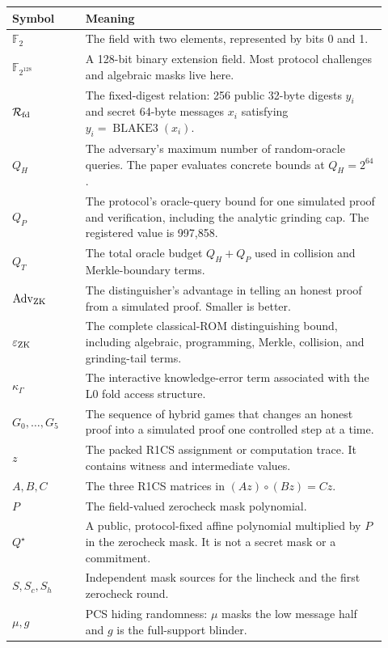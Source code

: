 \documentclass[11pt]{article}
\newcommand{\F}{\mathbb{F}}
\begin{document}
\begin{longtable}{@{}>{\raggedright\arraybackslash}p{0.18\linewidth}
                       >{\raggedright\arraybackslash}p{0.74\linewidth}@{}}
\toprule
Symbol & Meaning \\
\midrule
\endhead
$\F_2$ & The field with two elements, represented by bits 0 and 1. \\
$\F_{2^{128}}$ & A 128-bit binary extension field. Most protocol challenges and algebraic masks live here. \\
$\mathcal{R}_{\rm fd}$ & The fixed-digest relation: 256 public 32-byte digests $y_i$ and secret 64-byte messages $x_i$ satisfying $y_i=\operatorname{BLAKE3}(x_i)$. \\
$Q_H$ & The adversary's maximum number of random-oracle queries. The paper evaluates concrete bounds at $Q_H=2^{64}$. \\
$Q_P$ & The protocol's oracle-query bound for one simulated proof and verification, including the analytic grinding cap. The registered value is 997,858. \\
$Q_T$ & The total oracle budget $Q_H+Q_P$ used in collision and Merkle-boundary terms. \\
$\operatorname{Adv}_{\rm ZK}$ & The distinguisher's advantage in telling an honest proof from a simulated proof. Smaller is better. \\
$\varepsilon_{\rm ZK}$ & The complete classical-ROM distinguishing bound, including algebraic, programming, Merkle, collision, and grinding-tail terms. \\
$\kappa_\Gamma$ & The interactive knowledge-error term associated with the L0 fold access structure. \\
$G_0,\ldots,G_5$ & The sequence of hybrid games that changes an honest proof into a simulated proof one controlled step at a time. \\
$z$ & The packed R1CS assignment or computation trace. It contains witness and intermediate values. \\
$A,B,C$ & The three R1CS matrices in $(Az)\circ(Bz)=Cz$. \\
$P$ & The field-valued zerocheck mask polynomial. \\
$Q^\star$ & A public, protocol-fixed affine polynomial multiplied by $P$ in the zerocheck mask. It is not a secret mask or a commitment. \\
$S,S_c,S_h$ & Independent mask sources for the lincheck and the first zerocheck round. \\
$\mu,g$ & PCS hiding randomness: $\mu$ masks the low message half and $g$ is the full-support blinder. \\

\end{longtable}
\end{document}
